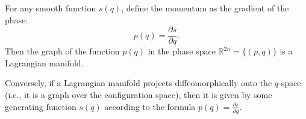 For any smooth function $s(q)$, define the momentum as the gradient of the phase:
$$p(q) = \frac{\partial s}{\partial q}.$$
Then the graph of the function $p(q)$ in the phase space $\mathbb{R}^{2n} = \{(p,q)\}$ is a Lagrangian manifold.

Conversely, if a Lagrangian manifold projects diffeomorphically onto the $q$-space (i.e., it is a graph over the configuration space), then it is given by some generating function $s(q)$ according to the formula $p(q) = \frac{\partial s}{\partial q}$.
